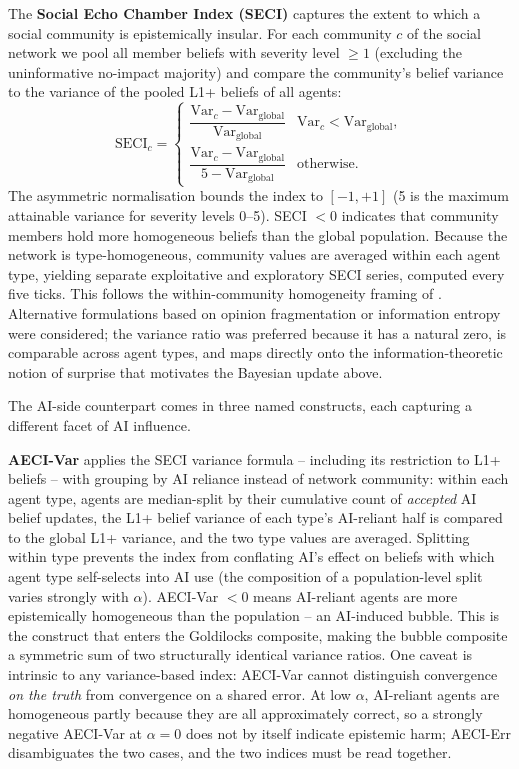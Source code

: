 \documentclass[sn-apacite]{sn-jnl}
\begin{document}
The \textbf{Social Echo Chamber Index (SECI)} captures the extent to which a social community is epistemically insular. For each community $c$ of the social network we pool all member beliefs with severity level $\geq 1$ (excluding the uninformative no-impact majority) and compare the community's belief variance to the variance of the pooled L1+ beliefs of all agents:
\begin{equation}
\text{SECI}_c =
\begin{cases}
\dfrac{\text{Var}_c - \text{Var}_{\text{global}}}{\text{Var}_{\text{global}}} & \text{Var}_c < \text{Var}_{\text{global}}, \\[2ex]
\dfrac{\text{Var}_c - \text{Var}_{\text{global}}}{5 - \text{Var}_{\text{global}}} & \text{otherwise}.
\end{cases}
\label{eq:seci}
\end{equation}
The asymmetric normalisation bounds the index to $[-1, +1]$ (5 is the maximum attainable variance for severity levels 0--5). SECI $< 0$ indicates that community members hold more homogeneous beliefs than the global population. Because the network is type-homogeneous, community values are averaged within each agent type, yielding separate exploitative and exploratory SECI series, computed every five ticks. This follows the within-community homogeneity framing of \citet{cinelli2021echo}. %
Alternative formulations based on opinion fragmentation \citep{bail2018exposure} or information entropy \citep{sasahara2021social} %
were considered; the variance ratio was preferred because it has a natural zero, is comparable across agent types, and maps directly onto the information-theoretic notion of surprise that motivates the Bayesian update above.

The AI-side counterpart comes in three named constructs, each capturing a different facet of AI influence.

\textbf{AECI-Var} applies the SECI variance formula -- including its restriction to L1+ beliefs -- with grouping by AI reliance instead of network community: within each agent type, agents are median-split by their cumulative count of \emph{accepted} AI belief updates, the L1+ belief variance of each type's AI-reliant half is compared to the global L1+ variance, and the two type values are averaged. Splitting within type prevents the index from conflating AI's effect on beliefs with which agent type self-selects into AI use (the composition of a population-level split varies strongly with $\alpha$). AECI-Var $< 0$ means AI-reliant agents are more epistemically homogeneous than the population -- an AI-induced bubble. This is the construct that enters the Goldilocks composite, making the bubble composite a symmetric sum of two structurally identical variance ratios. One caveat is intrinsic to any variance-based index: AECI-Var cannot distinguish convergence \emph{on the truth} from convergence on a shared error. At low $\alpha$, AI-reliant agents are homogeneous partly because they are all approximately correct, so a strongly negative AECI-Var at $\alpha = 0$ does not by itself indicate epistemic harm; AECI-Err disambiguates the two cases, and the two indices must be read together.
\end{document}
